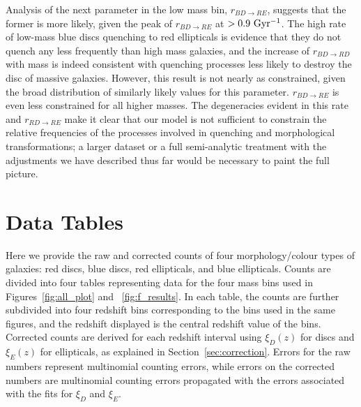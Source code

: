 \documentclass[useAMS,usenatbib]{mn2e}
\begin{document}
 Analysis of the next parameter in the low mass bin, $r_{BD\rightarrow RE}$, suggests that the former is more likely, given the peak of $r_{BD \rightarrow RE}$ at $>0.9 ~\rm Gyr^{-1}$. The high rate of low-mass blue discs quenching to red ellipticals is evidence that they do not quench any less frequently than high mass galaxies, and the increase of $r_{BD \rightarrow RD}$ with mass is indeed consistent with quenching processes less likely to destroy the disc of massive galaxies. However, this result is not nearly as constrained, given the broad distribution of similarly likely values for this parameter. $r_{BD \rightarrow RE}$ is even less constrained for all higher masses. The degeneracies evident in this rate and $r_{RD \rightarrow RE}$ make it clear that our model is not sufficient to constrain the relative frequencies of the processes involved in quenching and morphological transformations; a larger dataset or a full semi-analytic treatment with the adjustments we have described thus far would be necessary to paint the full picture. 

\section{Data Tables}
\label{appx:datatables}
Here we provide the raw and corrected counts of four morphology/colour types of galaxies: red discs, blue discs, red ellipticals, and blue ellipticals. Counts are divided into four tables representing data for the four mass bins used in Figures~\ref{fig:all_plot} and ~\ref{fig:f_results}. In each table, the counts are further subdivided into four redshift bins corresponding to the bins used in the same figures, and the redshift displayed is the central redshift value of the bins. Corrected counts are derived for each redshift interval using $\xi_D(z)$ for discs and $\xi_E(z)$ for ellipticals, as explained in Section~\ref{sec:correction}. Errors for the raw numbers represent multinomial counting errors, while errors on the corrected numbers are multinomial counting errors propagated with the errors associated with the fits for $\xi_D$ and $\xi_E$.  
\end{document}
